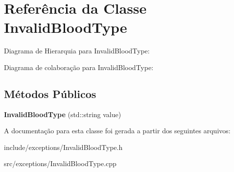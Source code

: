 \hypertarget{classInvalidBloodType}{}\section{Referência da Classe Invalid\+Blood\+Type}
\label{classInvalidBloodType}


Diagrama de Hierarquia para Invalid\+Blood\+Type\+:


Diagrama de colaboração para Invalid\+Blood\+Type\+:
\subsection*{Métodos Públicos}
\begin{DoxyCompactItemize}
\item 
\mbox{\label{classInvalidBloodType_a3701fa2556b736aac627ffb7e1bea292}} 
{\bfseries Invalid\+Blood\+Type} (std\+::string value)
\end{DoxyCompactItemize}


A documentação para esta classe foi gerada a partir dos seguintes arquivos\+:\begin{DoxyCompactItemize}
\item 
include/exceptions/Invalid\+Blood\+Type.\+h\item 
src/exceptions/Invalid\+Blood\+Type.\+cpp\end{DoxyCompactItemize}
